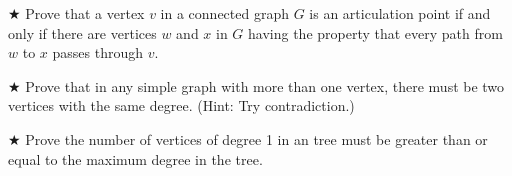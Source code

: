 \begin{proofp}$\bigstar$
Prove that a vertex $v$ in a connected graph $G$ is an articulation point if and only if there are vertices $w$ and $x$ in $G$ having the property that every path from $w$ to $x$ passes through $v$.
\end{proofp}



\begin{proofp}$\bigstar$
Prove that in any simple graph with more than one vertex, there must be two vertices with the same degree. (Hint: Try contradiction.)
\end{proofp}



\begin{proofp}$\bigstar$
Prove the number of vertices of degree 1 in an tree must be greater than or equal to the maximum degree in the tree.
\end{proofp}